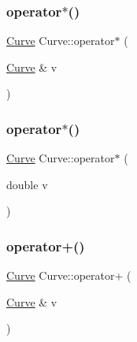 \mbox{\label{class_curve_a671fb149eecca0baf80672a6e2ffc8a5}} 
\subsubsection{\texorpdfstring{operator$\ast$()}{operator*()}\hspace{0.1cm}{\footnotesize\ttfamily [1/2]}}
{\footnotesize\ttfamily \hyperlink{class_curve}{Curve} Curve\+::operator$\ast$ (\begin{DoxyParamCaption}\item[{\hyperlink{class_curve}{Curve} \&}]{v }\end{DoxyParamCaption})}

\mbox{\label{class_curve_a9ed9c49020ce01f29587000711963beb}} 
\subsubsection{\texorpdfstring{operator$\ast$()}{operator*()}\hspace{0.1cm}{\footnotesize\ttfamily [2/2]}}
{\footnotesize\ttfamily \hyperlink{class_curve}{Curve} Curve\+::operator$\ast$ (\begin{DoxyParamCaption}\item[{double}]{v }\end{DoxyParamCaption})}

\mbox{\label{class_curve_a015ca17f63cc971bb7c2885b2d2de2df}} 
\subsubsection{\texorpdfstring{operator+()}{operator+()}\hspace{0.1cm}{\footnotesize\ttfamily [1/2]}}
{\footnotesize\ttfamily \hyperlink{class_curve}{Curve} Curve\+::operator+ (\begin{DoxyParamCaption}\item[{\hyperlink{class_curve}{Curve} \&}]{v }\end{DoxyParamCaption})}

\mbox{\label{class_curve_a03352202f80edde95e6581485ee78e1c}} 
